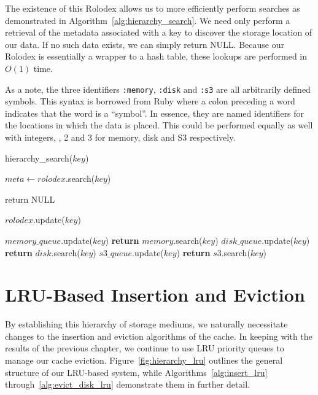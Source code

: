 The existence of this Rolodex allows us to more efficiently perform searches as
demonstrated in Algorithm~\ref{alg:hierarchy_search}. We need only perform a
retrieval of the metadata associated with a key to discover the storage
location of our data. If no such data exists, we can simply return NULL\@.
Because our Rolodex is essentially a wrapper to a hash table, these lookups are
performed in $O(1)$ time.

As a note, the three identifiers {\tt :memory}, {\tt :disk} and {\tt :s3}
are all arbitrarily defined symbols. This syntax is borrowed from Ruby where a
colon preceding a word indicates that the word is a ``symbol''. In essence,
they are named identifiers for the locations in which the data is placed. This
could be performed equally as well with integers, , 2 and 3 for memory,
disk and S3 respectively.

\begin{algorithm}[htp]
\small
\caption{\label{alg:hierarchy_search}hierarchy\_search($key$)}
\begin{algorithmic}[1]
\STATE $meta \leftarrow rolodex$.search($key$)

  \STATE return NULL
\ENDIF

\STATE $rolodex$.update($key$)

	\STATE $memory\_queue$.update($key$)
	\STATE \textbf{return} $memory$.search($key$)
	\STATE $disk\_queue$.update($key$)
	\STATE \textbf{return} $disk$.search($key$)
	\STATE $s3\_queue$.update($key$)
	\STATE \textbf{return} $s3$.search($key$)
\ENDIF
\end{algorithmic}
\end{algorithm}


\section{LRU-Based Insertion and Eviction} %
\label{sec:storage_insertion_eviction}
By establishing this hierarchy of storage mediums, we naturally necessitate
changes to the insertion and eviction algorithms of the cache. In keeping with
the results of the previous chapter, we continue to use LRU priority queues to
manage our cache eviction. Figure~\ref{fig:hierarchy_lru} outlines the general
structure of our LRU-based system, while Algorithms~\ref{alg:insert_lru}
through~\ref{alg:evict_disk_lru} demonstrate them in further detail.

